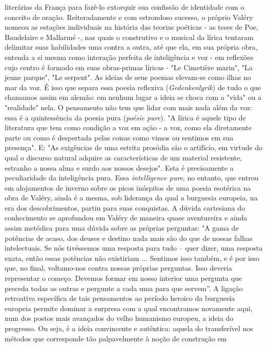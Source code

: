 literárias da França para fazê-lo extorquir sua confissão de identidade
com o conceito de oração. Reiteradamente e com estrondoso sucesso, o
próprio Valéry nomeou as estações individuais na história das teorias
poéticas - as teses de Poe, Baudelaire e Mallarmé -, nas quais o
construtivo e o musical da lírica tentaram delimitar suas habilidades
uma contra a outra, até que ela, em sua própria obra, entenda a si mesma
como interação perfeita de inteligência e voz - em reflexões cujo centro
é formado em suas obras-primas líricas - "Le Cimetière marin", "La jeune
parque", "Le serpent". As ideias de seus poemas elevam-se como ilhas no
mar da voz. É isso que separa essa poesia reflexiva
(\emph{Gedenkenlyrik}) de tudo o que chamamos assim em alemão: em nenhum
lugar a ideia se choca com a "vida" ou a "realidade" nela. O pensamento
não tem que lidar com mais nada além da voz: essa é a quintessência da
poesia pura (\emph{poésie pure}). "A lírica é aquele tipo de literatura
que tem como condição a voz em ação - a voz, como ela diretamente parte
ou como é despertada pelas coisas como vimos ou sentimos em sua
presença". E: "As exigências de uma estrita prosódia são o artifício, em
virtude do qual o discurso natural adquire as características de um
material resistente, estranho a nossa alma e surdo aos nossos desejos".
Esta é precisamente a peculiaridade da inteligência pura. Essa
\emph{intelligence pure}, no entanto, que entrou em alojamentos de
inverno sobre os picos inóspitos de uma poesia esotérica na obra de
Valéry, ainda é a mesma, sob liderança da qual a burguesia europeia, na
era dos descobrimentos, partiu para suas conquistas. A dúvida cartesiana
do conhecimento se aprofundou em Valéry de maneira quase aventureira e
ainda assim metódica para uma dúvida sobre as próprias perguntas: "A
gama de potências de acaso, dos deuses e destino nada mais são do que de
nossas falhas intelectuais. Se nós tivéssemos uma resposta para tudo --
quer dizer, uma resposta exata, então essas potências não existiriam ...
Sentimos isso também, e é por isso que, no final, voltamo-nos contra
nossas próprias perguntas. Isso deveria representar o começo. Devemos
formar em nosso interior uma pergunta que preceda todas as outras e
pergunte a cada uma para que servem''. A ligação retroativa específica
de tais pensamentos ao período heroico da burguesia europeia permite
dominar a surpresa com a qual encontramos novamente aqui, num dos postos
mais avançados do velho humanismo europeu, a ideia do progresso. Ou
seja, é a ideia convincente e autêntica: aquela do transferível nos
métodos que corresponde tão palpavelmente à noção de construção em
